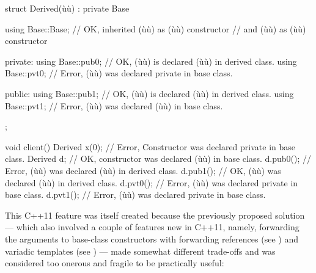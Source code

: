 \begin{emcppslisting}[emcppsbatch=e13]
struct Derived(ù{\footnotemark}ù) : private Base
{
    using Base::Base;  // OK, inherited (ù{}ù) as (ù{}ù) constructor
                       // and (ù{}ù) as (ù{}ù) constructor

private:
    using Base::pub0;  // OK, (ù{}ù) is declared (ù{}ù) in derived class.
    using Base::pvt0;  // Error, (ù{}ù) was declared private in base class.

public:
    using Base::pub1;  // OK, (ù{}ù) is declared (ù{}ù) in derived class.
    using Base::pvt1;  // Error, (ù{}ù) was declared (ù{}ù) in base class.
};

void client()
{
     Derived x(0);  // Error, Constructor was declared private in base class.
     Derived d;     // OK, constructor was declared (ù{}ù) in base class.
     d.pub0();      // Error, (ù{}ù) was declared (ù{}ù) in derived class.
     d.pub1();      // OK, (ù{}ù) was declared (ù{}ù) in derived class.
     d.pvt0();      // Error, (ù{}ù) was declared private in base class.
     d.pvt1();      // Error, (ù{}ù) was declared private in base class.
}
\end{emcppslisting}
{\cprotect{}}

\noindent This C++11 feature was itself created because the previously proposed
solution --- which also involved a couple of features new in C++11, namely,
forwarding the arguments to base-class constructors with
forwarding references (see )
and variadic
templates (see )
--- made somewhat different trade-offs and was
considered too onerous and fragile to be practically useful:

